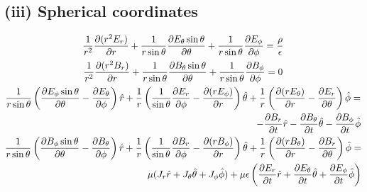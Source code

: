 \documentclass[11pt, a4paper]{article}
\begin{document}
\subsection*{(iii) Spherical coordinates}
\begin{gather}
    \frac{1}{r^2}\pdv{(r^2 E_r)}{r}+\frac{1}{r \sin \theta}\pdv{E_\theta \sin \theta}{\theta}+\frac{1}{r \sin \theta}\pdv{E_\phi}{\phi}=\frac{\rho}{\epsilon }\\
    \frac{1}{r^2}\pdv{(r^2 B_r)}{r}+\frac{1}{r \sin \theta}\pdv{B_\theta \sin \theta}{\theta}+\frac{1}{r \sin \theta}\pdv{B_\phi}{\phi}=0\\
    \begin{split}
    \frac{1}{r \sin \theta}\left(\pdv{E_\phi \sin \theta}{\theta}-\pdv{E_\theta}{\phi}\right)\hat{r} + \frac{1}{r}\left(\frac{1}{\sin \theta}\pdv{E_r}{\phi}-\pdv{(rE_\phi)}{r}\right)\hat{\theta} +\frac{1}{r}\left(\pdv{(rE_\theta)}{r}-\pdv{E_r}{\theta}\right)\hat{\phi}=\\-\pdv{B_r}{t}\hat{r}-\pdv{B_\theta}{t}\hat{\theta}  -\pdv{B_\phi}{t}\hat{\phi} 
    \end{split}\\
    \begin{split}
        \frac{1}{r \sin \theta}\left(\pdv{B_\phi \sin \theta}{\theta}-\pdv{B_\theta}{\phi}\right)\hat{r} + \frac{1}{r}\left(\frac{1}{\sin \theta}\pdv{B_r}{\phi}-\pdv{(rB_\phi)}{r}\right)\hat{\theta} +\frac{1}{r}\left(\pdv{(rB_\theta)}{r}-\pdv{B_r}{\theta}\right)\hat{\phi}=\\\mu (J_{r} \hat{r}+J_\theta \hat{\theta} + J_\phi \hat{\phi})+\mu \epsilon \left(\pdv{E_r}{t}\hat{r}+\pdv{E_\theta}{t}\hat{\theta}  +\pdv{E_\phi}{t}\hat{\phi} \right)
        \end{split} 
\end{gather}
\end{document}
